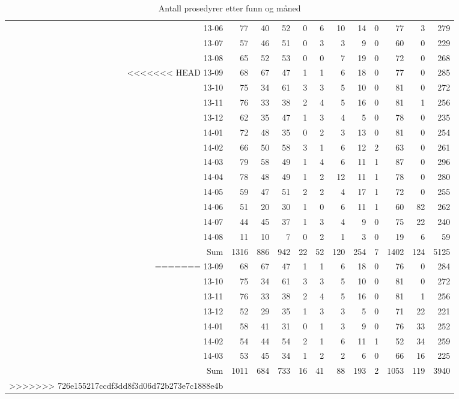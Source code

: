\documentclass[presentation,xcolor=pdftex,dvipsnames,table]{beamer}
\begin{document}
\begin{frame}
\begin{tiny}
\begin{table}[ht]
\begin{tabular}{rrrrrrrrrrrr}
  13-06 & 77 & 40 & 52 & 0 & 6 & 10 & 14 & 0 & 77 & 3 & 279 \\ 
  13-07 & 57 & 46 & 51 & 0 & 3 & 3 & 9 & 0 & 60 & 0 & 229 \\ 
  13-08 & 65 & 52 & 53 & 0 & 0 & 7 & 19 & 0 & 72 & 0 & 268 \\ 
<<<<<<< HEAD
  13-09 & 68 & 67 & 47 & 1 & 1 & 6 & 18 & 0 & 77 & 0 & 285 \\ 
  13-10 & 75 & 34 & 61 & 3 & 3 & 5 & 10 & 0 & 81 & 0 & 272 \\ 
  13-11 & 76 & 33 & 38 & 2 & 4 & 5 & 16 & 0 & 81 & 1 & 256 \\ 
  13-12 & 62 & 35 & 47 & 1 & 3 & 4 & 5 & 0 & 78 & 0 & 235 \\ 
  14-01 & 72 & 48 & 35 & 0 & 2 & 3 & 13 & 0 & 81 & 0 & 254 \\ 
  14-02 & 66 & 50 & 58 & 3 & 1 & 6 & 12 & 2 & 63 & 0 & 261 \\ 
  14-03 & 79 & 58 & 49 & 1 & 4 & 6 & 11 & 1 & 87 & 0 & 296 \\ 
  14-04 & 78 & 48 & 49 & 1 & 2 & 12 & 11 & 1 & 78 & 0 & 280 \\ 
  14-05 & 59 & 47 & 51 & 2 & 2 & 4 & 17 & 1 & 72 & 0 & 255 \\ 
  14-06 & 51 & 20 & 30 & 1 & 0 & 6 & 11 & 1 & 60 & 82 & 262 \\ 
  14-07 & 44 & 45 & 37 & 1 & 3 & 4 & 9 & 0 & 75 & 22 & 240 \\ 
  14-08 & 11 & 10 & 7 & 0 & 2 & 1 & 3 & 0 & 19 & 6 & 59 \\ 
  Sum & 1316 & 886 & 942 & 22 & 52 & 120 & 254 & 7 & 1402 & 124 & 5125 \\ 
=======
  13-09 & 68 & 67 & 47 & 1 & 1 & 6 & 18 & 0 & 76 & 0 & 284 \\ 
  13-10 & 75 & 34 & 61 & 3 & 3 & 5 & 10 & 0 & 81 & 0 & 272 \\ 
  13-11 & 76 & 33 & 38 & 2 & 4 & 5 & 16 & 0 & 81 & 1 & 256 \\ 
  13-12 & 52 & 29 & 35 & 1 & 3 & 3 & 5 & 0 & 71 & 22 & 221 \\ 
  14-01 & 58 & 41 & 31 & 0 & 1 & 3 & 9 & 0 & 76 & 33 & 252 \\ 
  14-02 & 54 & 44 & 54 & 2 & 1 & 6 & 11 & 1 & 52 & 34 & 259 \\ 
  14-03 & 53 & 45 & 34 & 1 & 2 & 2 & 6 & 0 & 66 & 16 & 225 \\ 
  Sum & 1011 & 684 & 733 & 16 & 41 & 88 & 193 & 2 & 1053 & 119 & 3940 \\ 
>>>>>>> 726e155217ccdf3dd8f3d06d72b273e7c1888e4b
   \bottomrule
\end{tabular}
\caption{Antall prosedyrer etter funn og måned} 
\end{table}\end{tiny}
\end{frame}
\end{document}
